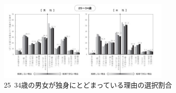 \documentclass[12pt]{ltjsarticle}
\begin{document}
\begin{figure}[h]
\centering
 \includegraphics[width=85mm]{bannkonnriyuu.jpg}
 \caption{25~34歳の男女が独身にとどまっている理由の選択割合}
 \label{fig:dokusin}
\end{figure}






\end{document}
